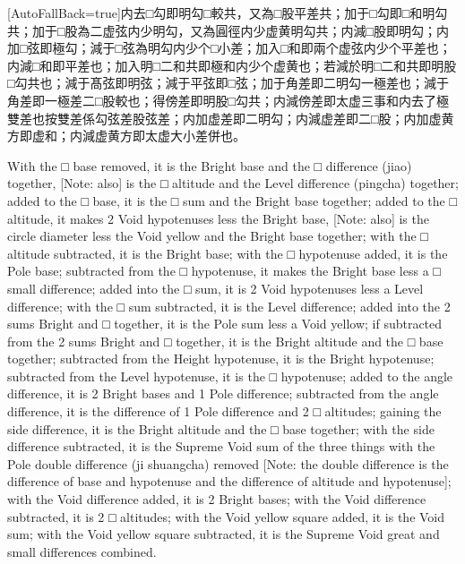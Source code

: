 \documentclass[11pt]{article}
\newcommand{\zhsmall}{\footnotesize\color{black!70}}
\newcommand{\unitlabel}[1]{\marginpar{\raggedleft\tiny\color{gray}#1}}
\newenvironment{unitzh}{\par\CJKfontspec{Noto Serif CJK SC}[AutoFallBack=true]\large\linespread{1.25}\selectfont}{\par}
\newenvironment{uniten}{\par\small\color{black!85}}{\par\medskip}
\begin{document}
\begin{unitzh}\unitlabel{ceyuan-003.22}内去□勾即明勾□較共，{\zhsmall 又}為□股平差共；加于□勾即□和明勾共；加于□股為二虚弦内少明勾，{\zhsmall 又}為圓徑内少虚黄明勾共；内減□股即明勾；内加□弦即極勾；減于□弦為明勾内少个□小差；加入□和即兩个虚弦内少个平差也；内減□和即平差也；加入明□二和共即極和内少个虚黄也；若減於明□二和共即明股□勾共也；減于髙弦即明弦；減于平弦即□弦；加于角差即二明勾一極差也；減于角差即一極差二□股較也；得傍差即明股□勾共；内減傍差即太虚三事和内去了極雙差也{\zhsmall 按雙差係勾弦差股弦差}；内加虚差即二明勾；内減虚差即二□股；内加虚黄方即虚和；内減虚黄方即太虚大小差併也。\end{unitzh}
\begin{uniten}With the □ base removed, it is the Bright base and the □ difference (jiao) together, [Note: also] is the □ altitude and the Level difference (pingcha) together; added to the □ base, it is the □ sum and the Bright base together; added to the □ altitude, it makes 2 Void hypotenuses less the Bright base, [Note: also] is the circle diameter less the Void yellow and the Bright base together; with the □ altitude subtracted, it is the Bright base; with the □ hypotenuse added, it is the Pole base; subtracted from the □ hypotenuse, it makes the Bright base less a □ small difference; added into the □ sum, it is 2 Void hypotenuses less a Level difference; with the □ sum subtracted, it is the Level difference; added into the 2 sums Bright and □ together, it is the Pole sum less a Void yellow; if subtracted from the 2 sums Bright and □ together, it is the Bright altitude and the □ base together; subtracted from the Height hypotenuse, it is the Bright hypotenuse; subtracted from the Level hypotenuse, it is the □ hypotenuse; added to the angle difference, it is 2 Bright bases and 1 Pole difference; subtracted from the angle difference, it is the difference of 1 Pole difference and 2 □ altitudes; gaining the side difference, it is the Bright altitude and the □ base together; with the side difference subtracted, it is the Supreme Void sum of the three things with the Pole double difference (ji shuangcha) removed [Note: the double difference is the difference of base and hypotenuse and the difference of altitude and hypotenuse]; with the Void difference added, it is 2 Bright bases; with the Void difference subtracted, it is 2 □ altitudes; with the Void yellow square added, it is the Void sum; with the Void yellow square subtracted, it is the Supreme Void great and small differences combined.\end{uniten}
\end{document}
